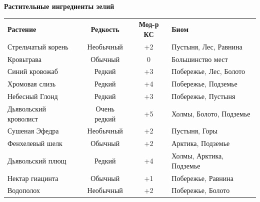 \documentclass[a4paper, 9pt, twocolumn]{book}
\begin{document}
	\begin{table}[H]
		
		{\Large \textbf{Растительные ингредиенты зелий}}
		
		\medspace
		
		\centering 
		
		\begin{tabularx}{\linewidth}{X C c X}
			
			\textbf{Растение} & \textbf{Редкость} & \textbf{Мод-р КС} & \textbf{Биом} \\
			
			Стрельчатый корень & Необычный & +2 & Пустыня, Лес, Равнина \\
			
			Кровьтрава & Обычный & 0 & Большинство мест \\
			
			Синий кровожаб & Редкий & +3 & Побережье, Лес, Болото \\
			
			Хромовая слизь & Редкий & +4 & Побережье, Подземье \\
			
			Небесный Глонд & Редкий & +3 & Побережье, Пустыня \\
			
			Дьявольский кроволист & Очень редкий & +5 & Холмы, Болото, Подземье \\
			
			Сушеная Эфедра & Необычный & +2 & Пустыня, Горы \\
			
			Фенхелевый шелк & Обычный & +2 & Арктика, Подземье \\
			
			Дьявольский плющ & Редкий  & +4 & Холмы, Арктика, Подземье \\
			
			Нектар гиацинта & Обычный & +1 & Побережье, Равнина \\
			
			Водополох & Необычный & +2 & Побережье, Болото \\
			

\end{tabularx}
\end{table}
\end{document}

